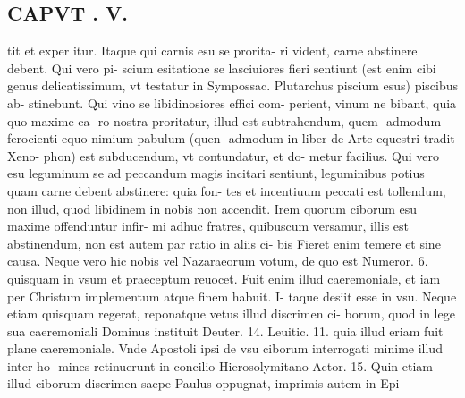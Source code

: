 \documentclass{article}
\begin{document}
\begin{pages}
\section*{CAPVT . V. }
\marginpar{[ p.377 ]}\pstart tit et exper itur. Itaque qui carnis esu se prorita- ri vident, carne abstinere debent. Qui vero pi- scium esitatione se lasciuiores fieri sentiunt (est enim cibi genus delicatissimum, vt testatur in Sympossac. Plutarchus piscium esus) piscibus ab- stinebunt. Qui vino se libidinosiores effici com- perient, vinum ne bibant, quia quo maxime ca- ro nostra proritatur, illud est subtrahendum, quem- admodum ferocienti equo nimium pabulum (quen- admodum in liber  de Arte equestri tradit Xeno- phon) est subducendum, vt contundatur, et do- metur facilius. Qui vero esu leguminum se ad peccandum magis incitari sentiunt, leguminibus potius quam carne debent abstinere: quia fon- tes et incentiuum peccati est tollendum, non illud, quod libidinem in nobis non accendit. Irem quorum ciborum esu maxime offenduntur infir- mi adhuc fratres, quibuscum versamur, illis est abstinendum, non est autem par ratio in aliis ci- bis Fieret enim temere et sine causa. Neque vero hic nobis vel Nazaraeorum votum, de quo est Numeror. 6. quisquam in vsum et praeceptum reuocet. Fuit enim illud caeremoniale, et iam per Christum implementum atque finem habuit. I- taque desiit esse in vsu. Neque etiam quisquam regerat, reponatque vetus illud discrimen ci- borum, quod in lege sua caeremoniali Dominus instituit Deuter. 14. Leuitic. 11. quia illud eriam fuit plane caeremoniale. Vnde Apostoli ipsi de vsu ciborum interrogati minime illud inter ho- mines retinuerunt in concilio Hierosolymitano Actor. 15. Quin etiam illud ciborum discrimen saepe Paulus oppugnat, imprimis autem in Epi-  \pend

\end{pages}
\end{document}
